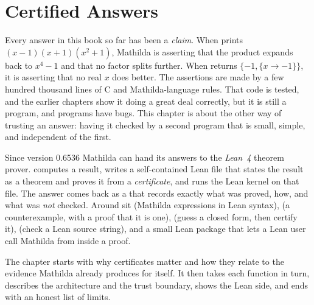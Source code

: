 \chapter{Certified Answers}
\label{ch:certified}


Every answer in this book so far has been a \emph{claim}. When  prints
\((x-1)(x+1)(x^2+1)\), Mathilda is asserting that the product expands back to
\(x^4-1\) and that no factor splits further. When  returns \(\{-1,
\{x\to-1\}\}\), it is asserting that no real \(x\) does better. The assertions are
made by a few hundred thousand lines of C and Mathilda-language rules. That code is
tested, and the earlier chapters show it doing a great deal correctly, but it is
still a program, and programs have bugs. This chapter is about the other way of
trusting an answer: having it checked by a second program that is small, simple,
and independent of the first.

Since version 0.6536 Mathilda can hand its answers to the
\emph{Lean~4} theorem prover.  computes a
result, writes a self-contained Lean file that states the result as a theorem and
proves it from a \emph{certificate}, and runs the Lean kernel on that file. The
answer comes back as a  that records exactly what
was proved, how, and what was \emph{not} checked. Around  sit
 (Mathilda expressions in Lean syntax),
 (a counterexample, with a proof that it is one),
 (guess a closed form, then certify it),
 (check a Lean source string), and a small Lean
package that lets a Lean user call Mathilda from inside a proof.%

The chapter starts with why certificates matter and how they relate to the evidence
Mathilda already produces for itself. It then takes each function in turn, describes
the architecture and the trust boundary, shows the Lean side, and ends with an honest
list of limits.

